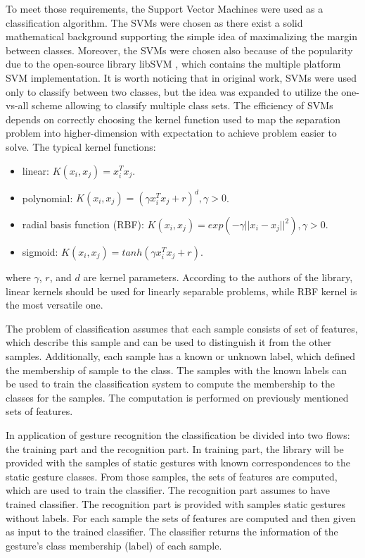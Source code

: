To meet those requirements, the Support Vector Machines \cite{Cortes:SVM} were used as a classification algorithm.
The SVMs were chosen as there exist a solid mathematical background supporting the simple idea of maximalizing the margin between classes.
Moreover, the SVMs were chosen also because of the popularity due to the open-source library libSVM \cite{libSVM}, which contains the multiple platform SVM implementation.
It is worth noticing that in original work, SVMs were used only to classify between two classes, but the idea was expanded to utilize the one-vs-all scheme allowing to classify multiple class sets.
The efficiency of SVMs depends on correctly choosing the kernel function used to map the separation problem into higher-dimension with expectation to achieve problem easier to solve.
The typical kernel functions:
\begin{itemize}
\item linear: $K(x_i, x_j) = x_i^Tx_j$.
\item polynomial: $K(x_i, x_j) = (\gamma x_i^Tx_j + r)^d, \gamma > 0$.
\item radial basis function (RBF): $K(x_i, x_j) = exp(-\gamma ||x_i - x_j||^2), \gamma > 0$.
\item sigmoid: $K(x_i, x_j) = tanh(\gamma x_i^Tx_j+r)$.
\end{itemize}
where $\gamma$, $r$, and $d$ are kernel parameters. According to the authors of the library, linear kernels should be used for linearly separable problems, while RBF kernel is the most versatile one.

The problem of classification assumes that each sample consists of set of features, which describe this sample and can be used to distinguish it from the other samples.
Additionally, each sample has a known or unknown label, which defined the membership of sample to the class. 
The samples with the known labels can be used to train the classification system to compute the membership to the classes for the samples. 
The computation is performed on previously mentioned sets of features.

In application of gesture recognition the classification be divided into two flows: the training part and the recognition part. 
In training part, the library will be provided with the samples of static gestures with known correspondences to the static gesture classes. 
From those samples, the sets of features are computed, which are used to train the classifier.
The recognition part assumes to have trained classifier. 
The recognition part is provided with samples static gestures without labels. 
For each sample the sets of features are computed and then given as input to the trained classifier.
The classifier returns the information of the gesture's class membership (label) of each sample.

